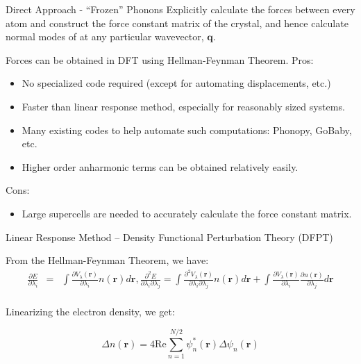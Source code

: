\documentclass[aspectratio=169]{beamer}
\let \vec \mathbf
\begin{document}
\begin{frame}{Direct Approach - ``Frozen'' Phonons}
Explicitly calculate the forces between every atom and construct the force constant matrix of the crystal, and hence calculate normal modes of at any particular wavevector, $\vec{q}$. \newline
\newline 

Forces can be obtained in DFT using Hellman-Feynman Theorem.\newline
\newline 
Pros:
\begin{itemize}
    \item No specialized code required (except for automating displacements, etc.)
    \item Faster than linear response method, especially for reasonably sized systems.
    \item Many existing codes to help automate such computations: Phonopy, GoBaby, etc.
    \item Higher order anharmonic terms can be obtained relatively easily.
\end{itemize}

Cons:
\begin{itemize}
    \item Large supercells are needed to accurately calculate the force constant matrix. 
\end{itemize}

\end{frame} 

\begin{frame}{Linear Response Method – Density Functional Perturbation Theory (DFPT)}

From the Hellman-Feynman Theorem, we have:
\begin{eqnarray*}
\frac{\partial E}{\partial \lambda_i} & = & \int \frac{\partial V_{\lambda}(\vec{r})}{\partial \lambda_i} n(\vec{r}) d\vec{r}, \frac{\partial^2 E}{\partial \lambda_i \partial \lambda_j} = \int \frac{\partial^2 V_{\lambda}(\vec{r})}{\partial \lambda_i \partial \lambda_j} n(\vec{r}) d\vec{r} + \int \frac{\partial V_{\lambda}(\vec{r})}{\partial \lambda_i } \frac{ \partial n(\vec{r}) }{\partial \lambda_j} d\vec{r}\\
\end{eqnarray*} 

Linearizing the electron density, we get:\cite{baroniPhononsRelatedCrystal2001}

\begin{equation*}
    \Delta n(\vec{r}) = 4 \mathrm{Re} \sum_{n=1}^{N/2} \psi_n^*(\vec{r}) \Delta \psi_n(\vec{r})
\end{equation*} 
\end{frame} 
\end{document}
